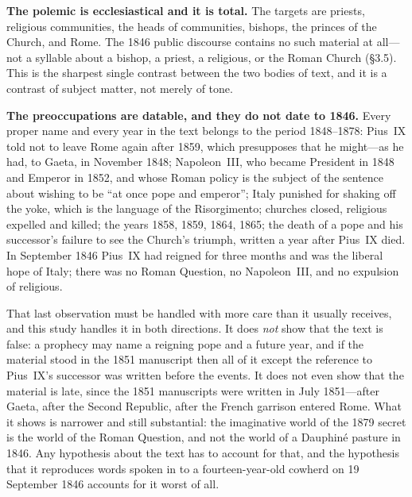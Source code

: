 \textbf{The polemic is ecclesiastical and it is total.} The targets
are priests, religious communities, the heads of communities,
bishops, the princes of the Church, and Rome. The 1846 public
discourse contains no such material at all---not a syllable about a
bishop, a priest, a religious, or the Roman Church (\S3.5). This is
the sharpest single contrast between the two bodies of text, and it
is a contrast of subject matter, not merely of tone.

\textbf{The preoccupations are datable, and they do not date to
1846.} Every proper name and every year in the text belongs to the
period 1848--1878: Pius~IX told not to leave Rome again after 1859,
which presupposes that he might---as he had, to Gaeta, in November
1848; Napoleon~III, who became President in 1848 and Emperor in
1852, and whose Roman policy is the subject of the sentence about
wishing to be ``at once pope and emperor''; Italy punished for
shaking off the yoke, which is the language of the Risorgimento;
churches closed, religious expelled and killed; the years 1858,
1859, 1864, 1865; the death of a pope and his successor's failure to
see the Church's triumph, written a year after Pius~IX died. In
September 1846 Pius~IX had reigned for three months and was the
liberal hope of Italy; there was no Roman Question, no Napoleon~III,
and no expulsion of religious.

That last observation must be handled with more care than it usually
receives, and this study handles it in both directions. It does
\emph{not} show that the text is false: a prophecy may name a
reigning pope and a future year, and if the material stood in the
1851 manuscript then all of it except the reference to Pius~IX's
successor was written before the events. It does not even show
that the material is late, since the 1851 manuscripts were written
in July 1851---after Gaeta, after the Second Republic, after the
French garrison entered Rome. What it shows is narrower and still
substantial: the imaginative world of the 1879 secret is the world
of the Roman Question, and not the world of a Dauphiné pasture in
1846. Any hypothesis about the text has to account for that, and the
hypothesis that it reproduces words spoken in  to a
fourteen-year-old cowherd on 19 September 1846 accounts for it worst
of all.

